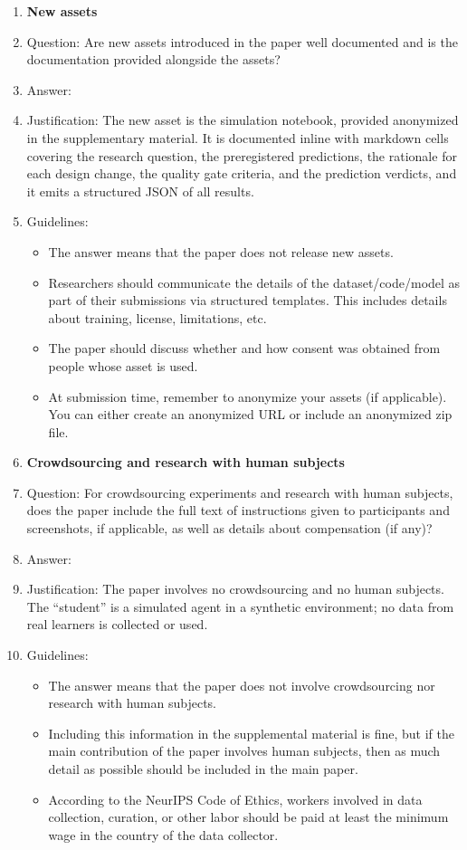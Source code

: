 \begin{enumerate}
\item {\bf New assets}
    \item[] Question: Are new assets introduced in the paper well documented and is the documentation provided alongside the assets?
    \item[] Answer: \answerYes{}
    \item[] Justification: The new asset is the simulation notebook, provided anonymized in the supplementary material. It is documented inline with markdown cells covering the research question, the preregistered predictions, the rationale for each design change, the quality gate criteria, and the prediction verdicts, and it emits a structured JSON of all results.
    \item[] Guidelines:
    \begin{itemize}
        \item The answer \answerNA{} means that the paper does not release new assets.
        \item Researchers should communicate the details of the dataset\slash code\slash model as part of their submissions via structured templates. This includes details about training, license, limitations, etc. 
        \item The paper should discuss whether and how consent was obtained from people whose asset is used.
        \item At submission time, remember to anonymize your assets (if applicable). You can either create an anonymized URL or include an anonymized zip file.
    \end{itemize}

\item {\bf Crowdsourcing and research with human subjects}
    \item[] Question: For crowdsourcing experiments and research with human subjects, does the paper include the full text of instructions given to participants and screenshots, if applicable, as well as details about compensation (if any)? 
    \item[] Answer: \answerNA{}
    \item[] Justification: The paper involves no crowdsourcing and no human subjects. The ``student'' is a simulated agent in a synthetic environment; no data from real learners is collected or used.
    \item[] Guidelines:
    \begin{itemize}
        \item The answer \answerNA{} means that the paper does not involve crowdsourcing nor research with human subjects.
        \item Including this information in the supplemental material is fine, but if the main contribution of the paper involves human subjects, then as much detail as possible should be included in the main paper. 
        \item According to the NeurIPS Code of Ethics, workers involved in data collection, curation, or other labor should be paid at least the minimum wage in the country of the data collector. 
    \end{itemize}


\end{enumerate}

